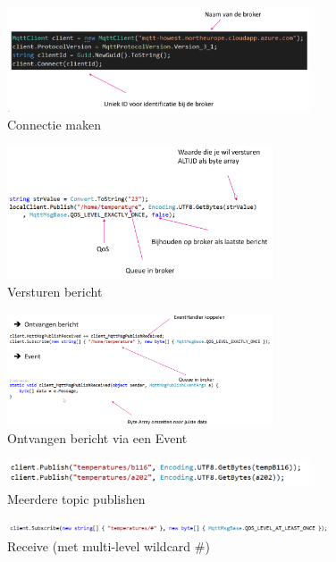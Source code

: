 \documentclass{article}
\begin{document}
\begin{figure}[H]
    \centering
    \includegraphics[width=0.8\textwidth]{mqtt-net1.png}
    \caption{Connectie maken}
\end{figure}

\begin{figure}[H]
    \centering
    \includegraphics[width=0.7\textwidth]{mqtt-net2.png}
    \caption{Versturen bericht}
\end{figure}

\begin{figure}[H]
    \centering
    \includegraphics[width=0.7\textwidth]{mqtt-net3.png}
    \caption{Ontvangen bericht via een Event}
\end{figure}

\begin{figure}[H]
    \centering
    \includegraphics[width=0.8\textwidth]{mqtt-net4.png}
    \caption{Meerdere topic publishen}
\end{figure}

\begin{figure}[H]
    \centering
    \includegraphics[width=0.85\textwidth]{mqtt-net5.png}
    \caption{Receive (met multi-level wildcard \#)}
\end{figure}
\end{document}
